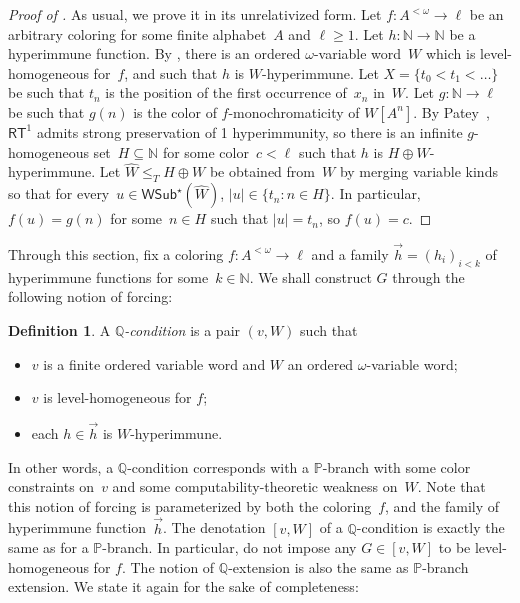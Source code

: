 \documentclass{article}
\def\PP{\mathbb{P}}
\def\QQ{\mathbb{Q}}
\newcommand{\RT}[0]{\mathsf{RT}}
\newcommand{\NN}[0]{\mathbb{N}}
\newcommand{\WSub}{\mathsf{WSub}}
\numberwithin{theorem}{section}
\theoremstyle{definition}
\newtheorem{definition}[theorem]{Definition}
\begin{document}
\begin{proof}[Proof of ]
As usual, we prove it in its unrelativized form.
Let $f : A^{<\omega} \to \ell$ be an arbitrary coloring for some finite alphabet~$A$ and $\ell \geq 1$. Let $h : \NN \to \NN$ be a hyperimmune function.
By , there is an ordered $\omega$-variable word~$W$ which is level-homogeneous for~$f$, and such that $h$ is $W$-hyperimmune.
Let $X = \{ t_0 < t_1 < \dots \}$ be such that $t_n$ is the position of the first occurrence of~$x_n$ in~$W$.
Let $g : \NN \to \ell$ be such that $g(n)$ is the color of $f$-monochromaticity of $W[A^n]$. By Patey~\cite[Theorem 28]{patey2017iterative}, $\RT^1$ admits strong preservation of 1 hyperimmunity, so there is an infinite $g$-homogeneous set~$H \subseteq \NN$ for some color~$c < \ell$ such that $h$ is $H \oplus W$-hyperimmune.
Let $\hat W \leq_T H \oplus W$ be obtained from~$W$ by merging variable kinds so that for every~$u \in \WSub^\star(\hat W)$, $|u| \in \{ t_n : n \in H \}$. In particular, $f(u) = g(n)$ for some~$n \in H$ such that $|u| = t_n$, so $f(u) = c$.
\end{proof}

Through this section, fix a coloring $f: A^{<\omega}\rightarrow\ell$ and a family $\vec{h} = (h_i)_{i < k}$ of hyperimmune functions for some~$k \in \NN$.
We shall construct $G$ through the following notion of forcing:

\begin{definition}
A \emph{$\QQ$-condition} is a pair $(v, W)$ such that
\begin{itemize}
    \item[(1)] $v$ is a finite ordered variable word and $W$ an ordered $\omega$-variable word;
    \item[(2)] $v$ is level-homogeneous for $f$;
    \item[(3)] each $h \in \vec{h}$ is $W$-hyperimmune.
\end{itemize}
\end{definition}

In other words, a $\QQ$-condition corresponds with a $\PP$-branch with some color constraints on~$v$ and some computability-theoretic weakness on~$W$. Note that this notion of forcing is parameterized by both the coloring~$f$, and the family of hyperimmune function~$\vec{h}$. The denotation $[v, W]$ of a $\QQ$-condition is exactly the same as for a $\PP$-branch.
In particular, do not impose any $G \in [v,W]$ to be level-homogeneous for $f$.
The notion of $\QQ$-extension is also the same as $\PP$-branch extension. We state it again for the sake of completeness:
\end{document}
